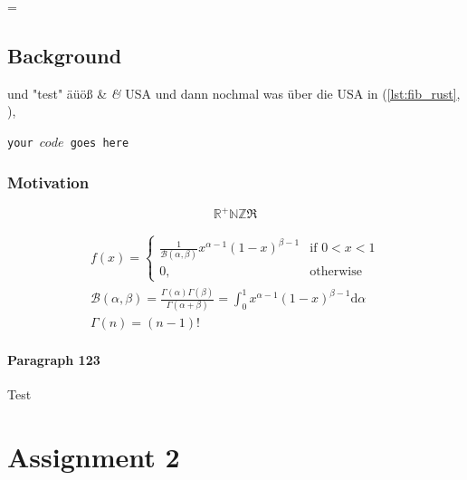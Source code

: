 \documentclass[numbers=noenddot,bibliography=totoc,12pt,sfdefaults=false]{scrartcl}
\begin{document}
\texttt{\parencite{Webster2002_Analyzing}} = \parencite{Webster2002_Analyzing}


\subsection{Background}
    \parencite{Webster2002_Analyzing} und \textcite{Webster2002_Analyzing} "test" äüöß \& \textit{\&} \ac{USA} und dann nochmal was über die \ac{USA} in  (\cref{lst:fib_rust}, \pageref{lst:fib_rust}), 
    
    \texttt{\texttt{your $code$ goes here}} 
\subsubsection{Motivation}

    $$\mathbb{R}^+ \mathbb{N Z} \mathfrak{R}$$

    \begin{gather}
        f(x) = \begin{cases}
                   \frac{1}{\mathcal{B}(\alpha,\beta)}x^{\alpha-1}(1-x)^{\beta-1} & \text{if } 0<x<1 \\
                   0, & \text{otherwise}
        \end{cases} \label{eq:betapdf} \\
        \mathcal{B}(\alpha,\beta) = \frac{\Gamma(\alpha)\Gamma(\beta)}{\Gamma(\alpha+\beta)}=\int_{0}^{1}x^{\alpha-1}(1-x)^{\beta-1}\text{d}\alpha \label{eq:beta} \\
        \Gamma(n)=(n-1)! \label{eq:gamma}
    \end{gather}

\paragraph{Paragraph 123} Test


    \section[A2]{Assignment 2}\label{sec:2}
\end{document}
